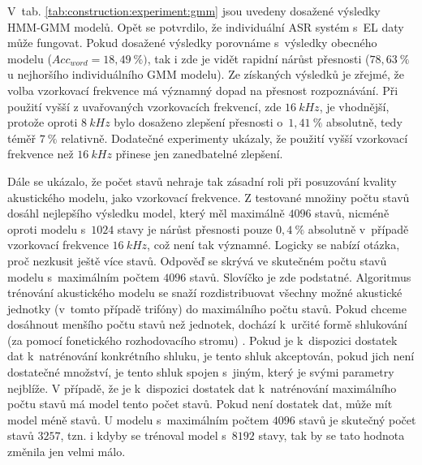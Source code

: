 
V~tab. \ref{tab:construction:experiment:gmm} jsou uvedeny dosažené výsledky HMM-GMM modelů.
Opět se potvrdilo, že individuální ASR systém s~EL daty může fungovat.
Pokud dosažené výsledky porovnáme s~výsledky obecného modelu ($Acc_{word} = 18,49~\%)$, tak i zde je vidět rapidní nárůst přesnosti ($78,63~\%$ u nejhoršího individuálního GMM modelu).
Ze získaných výsledků je zřejmé, že volba vzorkovací frekvence má významný dopad na přesnost rozpoznávání.
Při použití vyšší z uvařovaných vzorkovacích frekvencí, zde $16\ kHz$, je vhodnější, protože oproti $8\ kHz$ bylo dosaženo zlepšení přesnosti o~$1,41~\%$ absolutně, tedy téměř $7~\%$ relativně.
Dodatečné experimenty ukázaly, že použití vyšší vzorkovací frekvence než $16\ kHz$ přinese jen zanedbatelné zlepšení.

Dále se ukázalo, že počet stavů nehraje tak zásadní roli při posuzování kvality akustického modelu, jako vzorkovací frekvence.
Z testované množiny počtu stavů dosáhl nejlepšího výsledku model, který měl maximálně $4096$ stavů, nicméně oproti modelu s~$1024$ stavy je nárůst přesnosti pouze $0,4~\%$ absolutně v~případě vzorkovací frekvence $16\ kHz$, což není tak významné.
Logicky se nabízí otázka, proč nezkusit ještě více stavů.
Odpověď se skrývá ve skutečném počtu stavů modelu s~maximálním počtem $4096$ stavů.
Slovíčko  je zde podstatné.
Algoritmus trénování akustického modelu se snaží rozdistribuovat všechny možné akustické jednotky (v~tomto případě trifóny) do maximálního počtu stavů.
Pokud chceme dosáhnout menšího počtu stavů než jednotek, dochází  k~určité formě shlukování (za pomocí fonetického rozhodovacího stromu) \cite{Holmes2001}.
Pokud je  k~dispozici dostatek dat  k~natrénování konkrétního shluku, je tento shluk akceptován, pokud jich není dostatečné množství, je tento shluk spojen s~jiným, který je svými parametry nejblíže.
V případě, že je  k~dispozici dostatek dat k~natrénování maximálního počtu stavů má model tento počet stavů.
Pokud není dostatek dat, může mít model méně stavů.
U modelu s~maximálním počtem $4096$ stavů je skutečný počet stavů $3257$, tzn. i kdyby se trénoval model s~$8192$ stavy, tak by se tato hodnota změnila jen velmi málo.

